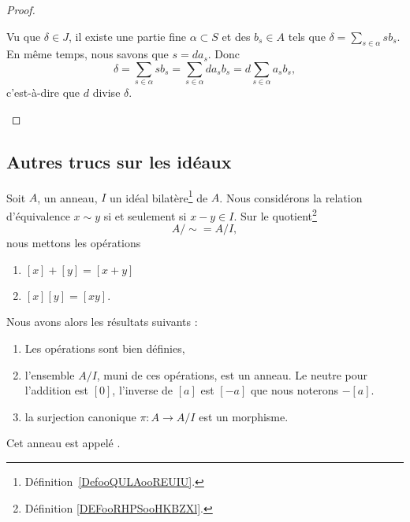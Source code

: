 \begin{proof}
\begin{subproof}
\begin{subproof}
			Vu que \( \delta\in J\), il existe une partie fine \( \alpha\subset S\) et des \( b_s\in A\) tels que \( \delta=\sum_{s\in \alpha}sb_s\). En même temps, nous savons que \( s=da_s\). Donc
			\begin{equation}
				\delta=\sum_{s\in \alpha}sb_s=\sum_{s\in \alpha}da_sb_s=d\sum_{s\in \alpha}a_sb_s,
			\end{equation}
			c'est-à-dire que \( d\) divise \( \delta\).
		\end{subproof}
	\end{subproof}
\end{proof}

\subsection{Autres trucs sur les idéaux}


\begin{propositionDef}      \label{PROPooGXMRooTcUGbi}
	Soit \( A\), un anneau, \( I\) un idéal bilatère\footnote{Définition~\ref{DefooQULAooREUIU}.} de \( A\). Nous considérons la relation d'équivalence \( x\sim y\) si et seulement si \( x-y\in I\). Sur le quotient\footnote{Définition \ref{DEFooRHPSooHKBZXl}.}
	\begin{equation}
		A/\sim=A/I,
	\end{equation}
	nous mettons les opérations
	\begin{enumerate}
		\item
		      \( [x]+[y]=[x+y]\)
		\item
		      \( [x][y]=[xy]\).
	\end{enumerate}
	Nous avons alors les résultats suivants :
	\begin{enumerate}
		\item       \label{ITEMooEJPEooRKAqmS}
		      Les opérations sont bien définies,
		\item       \label{ITEMooYBEGooTlHgNz}
		      l'ensemble \( A/I\), muni de ces opérations, est un anneau. Le neutre pour l'addition est \( [0]\), l'inverse de \( [a]\) est \( [-a]\) que nous noterons \( -[a]\).
		\item       \label{ITEMooLNRLooMkoWXZ}
		      la surjection canonique \( \pi\colon A\to A/I\) est un morphisme.
	\end{enumerate}
	Cet anneau est appelé .
\end{propositionDef}

